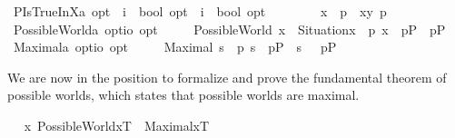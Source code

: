 \begin{isabellebody}
\ PIsTrueInX{\isacharcolon}{\isacharcolon}{\isachardoublequoteopen}{\isacharprime}a\ opt\ {\isasymRightarrow}\ {\isacharparenleft}i\ {\isasymRightarrow}\ bool{\isacharparenright}\ opt\ {\isasymRightarrow}\ {\isacharparenleft}i\ {\isasymRightarrow}\ bool{\isacharparenright}\ opt{\isachardoublequoteclose}\ {\isacharparenleft}\ {\isachardoublequoteopen}{\isasymTurnstile}{\isachardoublequoteclose}\ {}{}{\isacharparenright}\ \ \isanewline
\ \ \ {\isachardoublequoteopen}x\ {\isasymTurnstile}\ p\ {\isasymequiv}\ {\isasymlbrace}x{\isacharcomma}{\isacharparenleft}\isactrlbold {\isasymlambda}y{\isachardot}\ p{\isacharparenright}{\isasymrbrace}{\isachardoublequoteclose}\ \ \isanewline
\ \isamarkupfalse%
\ PossibleWorld{\isacharcolon}{\isacharcolon}{\isachardoublequoteopen}{\isacharprime}a\ opt{\isasymRightarrow}io\ opt{\isachardoublequoteclose}\ \ \isanewline
\ \ \ {\isachardoublequoteopen}PossibleWorld\ x\ {\isasymequiv}\ Situation{\isacharparenleft}x{\isacharparenright}\ \isactrlbold {\isasymand}\ \isactrlbold {\isasymdiamond}{\isacharparenleft}\isactrlbold {\isasymforall}p{\isachardot}\ {\isacharparenleft}x\ {\isasymTurnstile}\ p\isactrlsup P{\isacharparenright}\ \isactrlbold {\isasymequiv}\ p\isactrlsup P{\isacharparenright}{\isachardoublequoteclose}\ \isanewline
\ \isamarkupfalse%
\ Maximal{\isacharcolon}{\isacharcolon}{\isachardoublequoteopen}{\isacharprime}a\ opt{\isasymRightarrow}io\ opt{\isachardoublequoteclose}\ \ \isanewline
\ \ \ {\isachardoublequoteopen}Maximal\ s\ {\isasymequiv}\ {\isacharparenleft}\isactrlbold {\isasymforall}p{\isachardot}\ {\isacharparenleft}s\ {\isasymTurnstile}\ p\isactrlsup P{\isacharparenright}\ \isactrlbold {\isasymor}\ {\isacharparenleft}s\ {\isasymTurnstile}\ {\isacharparenleft}\isactrlbold {\isasymnot}\ p\isactrlsup P{\isacharparenright}{\isacharparenright}{\isacharparenright}{\isachardoublequoteclose}%
\begin{isamarkuptext}%
We are now in the position to formalize and prove the fundamental theorem of possible worlds,
  which states that possible worlds are maximal.%
\end{isamarkuptext}\isamarkuptrue%
\ \isamarkupfalse%
\ {\isachardoublequoteopen}{\isacharbrackleft}{\isacharparenleft}\isactrlbold {\isasymforall}x{\isachardot}\ PossibleWorld{\isacharparenleft}x\isactrlsup T{\isacharparenright}\ \isactrlbold {\isasymrightarrow}\ Maximal{\isacharparenleft}x\isactrlsup T{\isacharparenright}{\isacharparenright}{\isacharbrackright}\ {\isacharequal}\ {\isasymtop}{\isachardoublequoteclose}%

\end{isabellebody}
